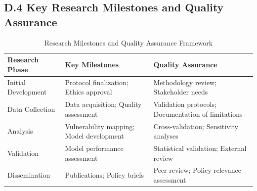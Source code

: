 \documentclass[12pt,a4paper,landscape]{article}
\begin{document}
\subsection*{D.4 Key Research Milestones and Quality Assurance}
\begin{table}[H]
    \centering
    \caption{Research Milestones and Quality Assurance Framework}
    \label{tab:milestones_qa}
    \begin{tabular}{L{3cm}L{6cm}L{6cm}}
        \toprule
        \textbf{Research Phase} & \textbf{Key Milestones} & \textbf{Quality Assurance} \\
        \midrule
        Initial Development & 
        Protocol finalization; Ethics approval & 
        Methodology review; Stakeholder needs \\
        \addlinespace
        Data Collection & 
        Data acquisition; Quality assessment & 
        Validation protocols; Documentation of limitations \\
        \addlinespace
        Analysis & 
        Vulnerability mapping; Model development & 
        Cross-validation; Sensitivity analyses \\
        \addlinespace
        Validation & 
        Model performance assessment & 
        Statistical validation; External review \\
        \addlinespace
        Dissemination & 
        Publications; Policy briefs & 
        Peer review; Policy relevance assessment \\
        \bottomrule
    \end{tabular}
\end{table}
\end{document}
